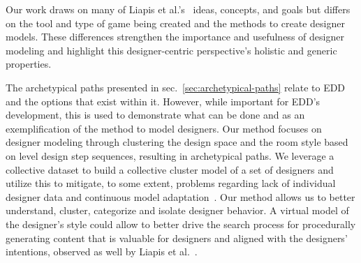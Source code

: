 


Our work draws on many of Liapis et al.'s~\cite{p10Liapis2013-designerModel,Liapis2014-designerModelImpl} ideas, concepts, and goals but differs on the tool and type of game being created and the methods to create designer models. These differences strengthen the importance and usefulness of designer modeling and highlight this designer-centric perspective's holistic and generic properties.

The archetypical paths presented in sec.~\ref{sec:archetypical-paths} relate to EDD and the options that exist within it. However, while important for EDD's development, this is used to demonstrate what can be done and as an exemplification of the method to model designers. Our method focuses on designer modeling through clustering the design space and the room style based on level design step sequences, resulting in archetypical paths. We leverage a collective dataset to build a collective cluster model of a set of designers and utilize this to mitigate, to some extent, problems regarding lack of individual designer data and continuous model adaptation~\cite{p10Alvarez2020-DesignerPreference}. Our method allows us to better understand, cluster, categorize and isolate designer behavior. A virtual model of the designer's style could allow to better drive the search process for procedurally generating content that is valuable for designers and aligned with the designers' intentions, observed as well by Liapis et al.~\cite{p10Liapis2013-designerModel}.



